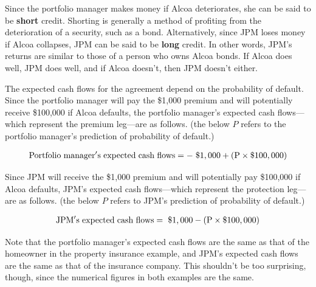 \documentclass{jss}
\begin{document}
Since the portfolio manager makes money if Alcoa deteriorates, she can be said to be \textbf{short} credit. Shorting is generally a method of profiting from the deterioration of a security, such as a bond. Alternatively, since JPM loses money if Alcoa collapses, JPM can be said to be \textbf{long} credit. In other words, JPM's returns are similar to those of a person who owns Alcoa bonds. If Alcoa does well, JPM does well, and if Alcoa doesn't, then JPM doesn't either.

The expected cash flows for the agreement depend on the probability of default. Since the portfolio manager will pay the \$1,000 premium and will potentially receive \$100,000 if Alcoa defaults, the portfolio manager's expected cash flows---which represent the premium leg---are as follows. (the below $P$ refers to the portfolio manager’s prediction of probability of default.)

\begin{equation}
 \begin{aligned}
   {\rm Portfolio\hspace{3pt}manager's\hspace{3pt}expected\hspace{3pt}cash\hspace{3pt}flows = -\hspace{3pt}\$1,000 + (P \times {\$100,000})}
    \end{aligned}
    \label{eqn:portfolioECF}
\end{equation}

Since JPM will receive the \$1,000 premium and will potentially pay \$100,000 if Alcoa defaults, JPM's expected cash flows---which represent the protection leg---are as follows. (the below $P$ refers to JPM’s prediction of probability of default.)

\begin{equation}
 \begin{aligned}
   {\rm JPM's\hspace{3pt}expected\hspace{3pt}cash\hspace{3pt}flows = \hspace{3pt}\$1,000 - (P \times {\$100,000})}
    \end{aligned}
    \label{eqn:jpmECF}
\end{equation}

Note that the portfolio manager's expected cash flows are the same as that of the homeowner in the property insurance example, and JPM's expected cash flows are the same as that of the insurance company. This shouldn't be too surprising, though, since the numerical figures in both examples are the same.
\end{document}
